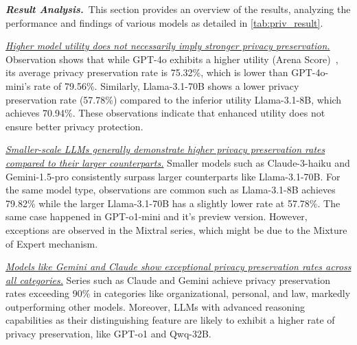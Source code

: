 \textbf{\textit {Result Analysis.}}~This section provides an overview of the results, analyzing the performance and findings of various models as detailed in \autoref{tab:priv_result}.

\textit{\ul{Higher model utility does not necessarily imply stronger privacy preservation.}} Observation shows that while GPT-4o exhibits a higher utility (Arena Score)~\cite{Arena_score}, its average privacy preservation rate is 75.32\%, which is lower than GPT-4o-mini’s rate of 79.56\%. Similarly, Llama-3.1-70B shows a lower privacy preservation rate (57.78\%) compared to the inferior utility Llama-3.1-8B, which achieves 70.94\%. These observations indicate that enhanced utility does not ensure better privacy protection.

\textit{\ul{Smaller-scale LLMs generally demonstrate higher privacy preservation rates compared to their larger counterparts.}} Smaller models such as Claude-3-haiku and Gemini-1.5-pro consistently surpass larger counterparts like Llama-3.1-70B. For the same model type, observations are common such as Llama-3.1-8B achieves 79.82\% while the larger Llama-3.1-70B has a slightly lower rate at 57.78\%. The same case happened in GPT-o1-mini and it's preview version. However, exceptions are observed in the Mixtral series, which might be due to the Mixture of Expert mechanism.

\textit{\ul{Models like Gemini and Claude show exceptional privacy preservation rates across all categories.}} Series such as Claude and Gemini achieve privacy preservation rates exceeding 90\% in categories like organizational, personal, and law, markedly outperforming other models. Moreover, LLMs with advanced reasoning capabilities as their distinguishing feature are likely to exhibit a higher rate of privacy preservation, like GPT-o1 and Qwq-32B.




